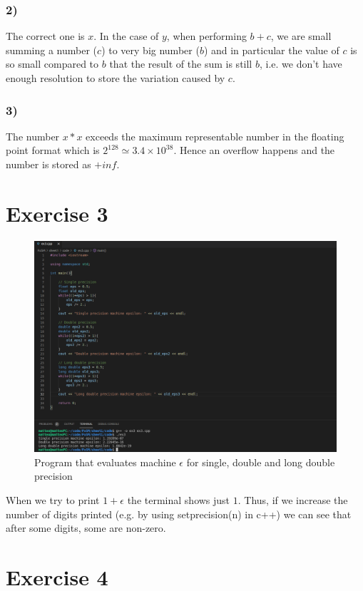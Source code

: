 \documentclass{article}
\begin{document}
\subsubsection*{2)}
The correct one is $x$. In the case of $y$, when performing $b+c$, we are small summing a number ($c$) to very big number ($b$) and in particular the value of $c$ is so small compared to $b$ that the result of the sum is still $b$, i.e. we don't have enough resolution to store the variation caused by $c$.
\subsubsection*{3)}
The number $x*x$ exceeds the maximum representable number in the floating point format which is $2^{128} \simeq 3.4 \times 10^{38}$. Hence an overflow happens and the number is stored as $+inf$.

\newpage 

\section*{Exercise 3}
\begin{figure}[h]
    \centering 
    \includegraphics[scale=0.35]{pics/machine_eps.png}
    \caption{Program that evaluates machine $\epsilon$ for single, double and long double precision}
    \label{fig:machine_epsilon}
\end{figure}
When we try to print $1+\epsilon$ the terminal shows just $1$. Thus, if we increase the number of digits printed (e.g. by using setprecision(n) in c++) we can see that after some digits, some are non-zero.

\section*{Exercise 4}
\end{document}
